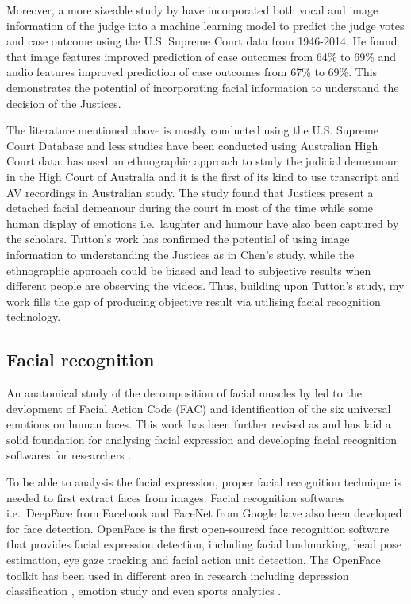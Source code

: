 \documentclass{monashthesis}
\begin{document}
Moreover, a more sizeable study by \textcite{chen2018justice} have incorporated both vocal and image information of the judge into a machine learning model to predict the judge votes and case outcome using the U.S. Supreme Court data from 1946-2014. He found that image features improved prediction of case outcomes from 64\% to 69\% and audio features improved prediction of case outcomes from 67\% to 69\%. This demonstrates the potential of incorporating facial information to understand the decision of the Justices.

The literature mentioned above is mostly conducted using the U.S. Supreme Court Database and less studies have been conducted using Australian High Court data. \textcite{tutton2018judicial} has used an ethnographic approach to study the judicial demeanour in the High Court of Australia and it is the first of its kind to use transcript and AV recordings in Australian study. The study found that Justices present a detached facial demeanour during the court in most of the time while some human display of emotions i.e.~laughter and humour have also been captured by the scholars. Tutton's work has confirmed the potential of using image information to understanding the Justices as in Chen's study, while the ethnographic approach could be biased and lead to subjective results when different people are observing the videos. Thus, building upon Tutton's study, my work fills the gap of producing objective result via utilising facial recognition technology.

\hypertarget{facial-recognition}{%
\subsection{Facial recognition}\label{facial-recognition}}

An anatomical study of the decomposition of facial muscles by \autocite{ekman1976measuring} led to the devlopment of Facial Action Code (FAC) \autocite{ekman1978} and identification of the six universal emotions on human faces. This work has been further revised as \autocite{paulekmangroup} and has laid a solid foundation for analysing facial expression and developing facial recognition softwares for researchers \autocites{Kobayashi1992}{huang1997}{lien2000}{Kappoor2003}{Tong2007}{Cohn2009}{Lucey2010}.

To be able to analysis the facial expression, proper facial recognition technique is needed to first extract faces from images. Facial recognition softwares i.e.~DeepFace \autocite{taigman2014deepface} from Facebook and FaceNet \autocite{schroff2015facenet} from Google have also been developed for face detection. OpenFace \autocite{baltrusaitis2018openface} is the first open-sourced face recognition software that provides facial expression detection, including facial landmarking, head pose estimation, eye gaze tracking and facial action unit detection. The OpenFace toolkit has been used in different area in research including depression classification \autocites{yang2016decision}{nasir2016multimodal}, emotion study \autocites{Pan2018}{Nasir2016}{Huber2018} and even sports analytics \autocite{kovalchik2018going}.
\end{document}
